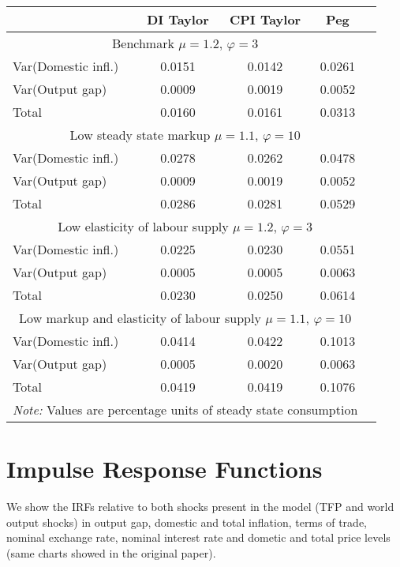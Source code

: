 \documentclass{article}
\begin{document}
\begin{table}[H]
    \centering
    \begin{tabular}{lcccc}
        \hline
        &  DI Taylor & CPI Taylor & Peg\\
        \hline
        \multicolumn{4}{c}{Benchmark $\mu = 1.2$, $\varphi = 3$}\\
        Var(Domestic infl.) & 0.0151 & 0.0142 & 0.0261 \\
        Var(Output gap) & 0.0009 & 0.0019 & 0.0052 \\
        Total & 0.0160 & 0.0161 & 0.0313 \\
        \multicolumn{4}{c}{Low steady state markup $\mu = 1.1$, $\varphi = 10$}\\
        Var(Domestic infl.) & 0.0278 & 0.0262 & 0.0478 \\
        Var(Output gap) & 0.0009 & 0.0019 & 0.0052 \\
        Total & 0.0286 & 0.0281 & 0.0529 \\
        \multicolumn{4}{c}{Low elasticity of labour supply $\mu = 1.2$, $\varphi = 3$}\\
        Var(Domestic infl.) & 0.0225 & 0.0230 & 0.0551 \\
        Var(Output gap) & 0.0005 & 0.0005 & 0.0063 \\
        Total & 0.0230 & 0.0250 & 0.0614 \\
        \multicolumn{4}{c}{Low markup and elasticity of labour supply $\mu = 1.1$, $\varphi = 10$}\\
        Var(Domestic infl.) & 0.0414 & 0.0422 & 0.1013 \\
        Var(Output gap) & 0.0005 & 0.0020 & 0.0063 \\
        Total & 0.0419 & 0.0419 & 0.1076 \\
        \hline
        \multicolumn{4}{l}{\textit{Note: } Values are percentage units of steady state consumption}
    \end{tabular}
\end{table}

\section{Impulse Response Functions}
We show the IRFs relative to both shocks present in the model (TFP and world output shocks) in output gap, domestic and total inflation, terms of trade, nominal exchange rate, nominal interest rate and dometic and total price levels (same charts showed in the original paper).
\end{document}
